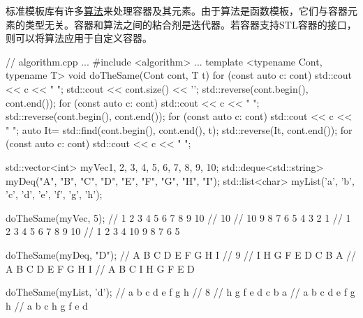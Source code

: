 
标准模板库有许多\href{http://en.cppreference.com/w/cpp/algorithm}{算法}来处理容器及其元素。由于算法是函数模板，它们与容器元素的类型无关。容器和算法之间的粘合剂是迭代器。若容器支持STL容器的接口，则可以将算法应用于自定义容器。


\begin{cpp}
// algorithm.cpp
...
#include <algorithm>
...
template <typename Cont, typename T>
void doTheSame(Cont cont, T t){
	for (const auto c: cont) std::cout << c << " ";
	std::cout << cont.size() << '\n';
	std::reverse(cont.begin(), cont.end());
	for (const auto c: cont) std::cout << c << " ";
	std::reverse(cont.begin(), cont.end());
	for (const auto c: cont) std::cout << c << " ";
	auto It= std::find(cont.begin(), cont.end(), t);
	std::reverse(It, cont.end());
	for (const auto c: cont) std::cout << c << " ";
}

std::vector<int> myVec{1, 2, 3, 4, 5, 6, 7, 8, 9, 10};
std::deque<std::string> myDeq({"A", "B", "C", "D", "E", "F", "G", "H", "I"});
std::list<char> myList({'a', 'b', 'c', 'd', 'e', 'f', 'g', 'h'});

doTheSame(myVec, 5);
	// 1 2 3 4 5 6 7 8 9 10
	// 10
	// 10 9 8 7 6 5 4 3 2 1
	// 1 2 3 4 5 6 7 8 9 10
	// 1 2 3 4 10 9 8 7 6 5
	
doTheSame(myDeq, "D");
	// A B C D E F G H I
	// 9
	// I H G F E D C B A
	// A B C D E F G H I
	// A B C I H G F E D
	
doTheSame(myList, 'd');
	// a b c d e f g h
	// 8
	// h g f e d c b a
	// a b c d e f g h
	// a b c h g f e d
\end{cpp}




















